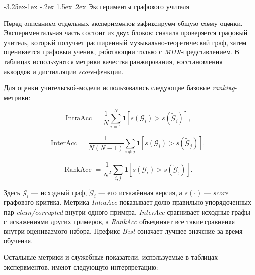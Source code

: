 \documentclass[a4paper,12pt]{extarticle}
\makeatletter
\renewcommand\subsection{\@startsection{subsection}{2}{\z@}%
  {-3.25ex\@plus -1ex \@minus -.2ex}%
  {1.5ex \@plus .2ex}%
  {\normalfont\large\bfseries\Needspace{6\baselineskip}}}
\makeatother
\begin{document}
\subsection{Эксперименты графового учителя}

Перед описанием отдельных экспериментов зафиксируем общую схему оценки. Экспериментальная часть состоит из двух блоков: сначала проверяется графовый учитель, который получает расширенный музыкально-теоретический граф, затем оценивается графовый ученик, работающий только с \textit{MIDI}-представлением. В таблицах используются метрики качества ранжирования, восстановления аккордов и дистилляции \textit{score}-функции.

Для оценки учительской-модели использовались следующие базовые \textit{ranking}-метрики:

\[
\operatorname{IntraAcc}=\frac{1}{N}\sum_{i=1}^{N}
\mathbf{1}\!\left[s(\mathcal{G}_i)>s(\widetilde{\mathcal{G}}_i)\right],
\]

\[
\operatorname{InterAcc}=\frac{1}{N(N-1)}\sum_{i\ne j}
\mathbf{1}\!\left[s(\mathcal{G}_i)>s(\widetilde{\mathcal{G}}_j)\right],
\]

\[
\operatorname{RankAcc}=\frac{1}{N^2}\sum_{i,j}
\mathbf{1}\!\left[s(\mathcal{G}_i)>s(\widetilde{\mathcal{G}}_j)\right].
\]

Здесь $\mathcal{G}_i$ --- исходный граф, $\widetilde{\mathcal{G}}_i$ --- его искажённая версия, а $s(\cdot)$ --- \textit{score} графового критика. Метрика \textit{IntraAcc} показывает долю правильно упорядоченных пар \textit{clean/corrupted} внутри одного примера, \textit{InterAcc} сравнивает исходные графы с искажениями других примеров, а \textit{RankAcc} объединяет все такие сравнения внутри оцениваемого набора. Префикс \textit{Best} означает лучшее значение за время обучения.

Остальные метрики и служебные показатели, используемые в таблицах экспериментов, имеют следующую интерпретацию:
\end{document}
